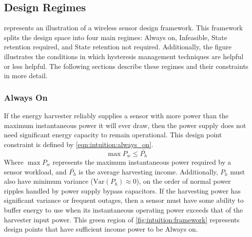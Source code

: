 
\subsection{Design Regimes}
\label{sec:framework:regime}
 represents an illustration of a wireless sensor design framework.
This framework splits the design space into four main regimes: \textsf{Always on},
\textsf{Infeasible}, \textsf{State retention required}, and \textsf{State retention not required}.
Additionally, the figure illustrates the conditions in which hysteresis management techniques are helpful or less helpful.
The following sections describe these regimes and their constraints in more detail.

\subsubsection{Always On}
If the energy harvester reliably supplies a sensor with
more power than the maximum instantaneous power it will ever draw, then the power supply does not need significant
energy capacity to remain operational.
This design point constraint is defined by \cref{eqn:intuition:always_on}.
\begin{equation}
    \label{eqn:intuition:always_on}
    \max P_w \leq \bar{P_h}
\end{equation}
Where $\max P_w$ represents the maximum instantaneous power required by a sensor workload, and $\bar{P_h}$ is the average harvesting income. Additionally, $P_h$ must also have minimum variance ($\mathrm{Var}(P_h) \approx 0$), on the order of normal power ripples handled by power supply bypass capacitors.
If the harvesting power has significant variance or frequent outages,
then a sensor must have some ability to buffer energy to use when its
instantaneous operating power exceeds that of the harvester input power.
This green region of \cref{fig:intuition:framework} represents design points that have sufficient income power to be \textsf{Always on}.

